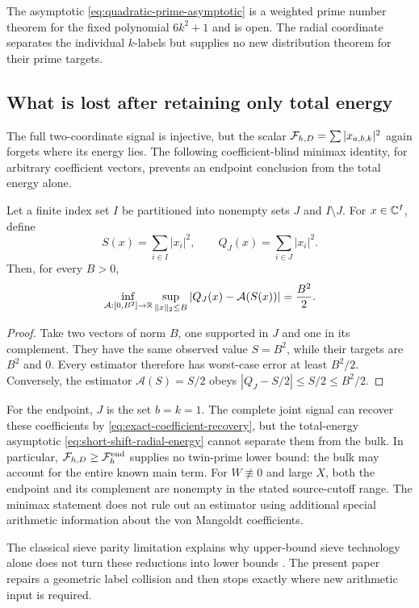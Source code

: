 The asymptotic \eqref{eq:quadratic-prime-asymptotic} is a weighted prime
number theorem for the fixed polynomial $6k^2+1$ and is open.  The radial
coordinate separates the individual $k$-labels but supplies no new
distribution theorem for their prime targets.

\subsection{What is lost after retaining only total energy}

The full two-coordinate signal is injective, but the scalar
$\mathcal F_{h,D}=\sum|x_{a,b,k}|^2$ again forgets where its energy lies.  The
following coefficient-blind minimax identity, for arbitrary coefficient
vectors, prevents an endpoint conclusion from the total energy alone.

\begin{proposition}
\label{prop:energy-minimax}
Let a finite index set $I$ be partitioned into nonempty sets $J$ and
$I\setminus J$.  For $x\in\mathbb C^I$, define
\[
 S(x)=\sum_{i\in I}|x_i|^2,
 \qquad
 Q_J(x)=\sum_{i\in J}|x_i|^2.
\]
Then, for every $B>0$,
\begin{equation}
 \inf_{\mathcal A:[0,B^2]\to\mathbb R}
 \sup_{\|x\|_2\leq B}
 |Q_J(x)-\mathcal A(S(x))|
 =\frac{B^2}{2}.
 \label{eq:energy-minimax}
\end{equation}
\end{proposition}

\begin{proof}
Take two vectors of norm $B$, one supported in $J$ and one in its
complement.  They have the same observed value $S=B^2$, while their
targets are $B^2$ and $0$.  Every estimator therefore has worst-case
error at least $B^2/2$.  Conversely, the estimator
$\mathcal A(S)=S/2$ obeys
$|Q_J-S/2|\leq S/2\leq B^2/2$.
\end{proof}

For the endpoint, $J$ is the set $b=k=1$.  The complete joint signal can
recover these coefficients by \eqref{eq:exact-coefficient-recovery}, but
the total-energy asymptotic \eqref{eq:short-shift-radial-energy} cannot
separate them from the bulk.  In particular,
$\mathcal F_{h,D}\geq\mathcal F_h^{\rm end}$ supplies no twin-prime lower bound: the
bulk may account for the entire known main term.
For $W\not\equiv0$ and large $X$, both the endpoint and its complement
are nonempty in the stated source-cutoff range.  The minimax statement
does not rule out an estimator using additional special arithmetic
information about the von Mangoldt coefficients.

The classical sieve parity limitation explains why upper-bound sieve
technology alone does not turn these reductions into lower bounds
\citep{Selberg1952Parity,Polymath2014}.  The present paper repairs a
geometric label collision and then stops exactly where new arithmetic
input is required.
